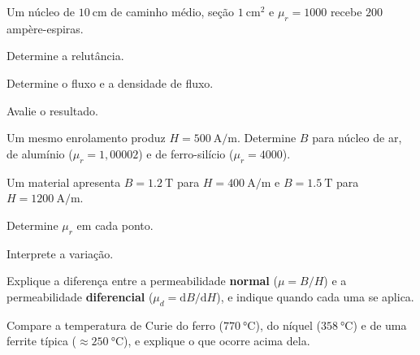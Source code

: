 \blocoaplicacao
\begin{questao}[2]{}

Um núcleo de $\SI{10}{\centi\meter}$ de caminho médio, seção
$\SI{1}{\centi\meter\squared}$ e $\mu_r=1000$ recebe $\SI{200}{}$
ampère-espiras.
\begin{itensq}
\item Determine a relutância.
\item Determine o fluxo e a densidade de fluxo.
\item Avalie o resultado.
\end{itensq}


\end{questao}
\begin{questao}[2]{}

Um mesmo enrolamento produz $H=\SI{500}{\ampere\per\meter}$. Determine $B$ para
núcleo de ar, de alumínio ($\mu_r=1{,}00002$) e de ferro-silício
($\mu_r=4000$).


\end{questao}
\begin{questao}[2]{}

Um material apresenta $B=\SI{1.2}{\tesla}$ para $H=\SI{400}{\ampere\per\meter}$
e $B=\SI{1.5}{\tesla}$ para $H=\SI{1200}{\ampere\per\meter}$.
\begin{itensq}
\item Determine $\mu_r$ em cada ponto.
\item Interprete a variação.
\end{itensq}


\end{questao}
\begin{questao}[2]{}

Explique a diferença entre a permeabilidade \textbf{normal}
($\mu=B/H$) e a permeabilidade \textbf{diferencial}
($\mu_d=\mathrm{d}B/\mathrm{d}H$), e indique quando cada uma se aplica.


\end{questao}
\begin{questao}[2]{}

Compare a temperatura de Curie do ferro ($\SI{770}{\celsius}$), do níquel
($\SI{358}{\celsius}$) e de uma ferrite típica
($\approx\SI{250}{\celsius}$), e explique o que ocorre acima dela.


\end{questao}

